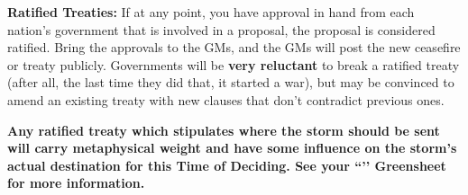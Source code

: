 \documentclass[green]{GL2020}
\begin{document}
\textbf{Ratified Treaties:}
If at any point, you have approval in hand from each nation’s government that is involved in a proposal, the proposal is considered ratified. Bring the approvals to the GMs, and the GMs will post the new ceasefire or treaty publicly. Governments will be \textbf{very reluctant} to break a ratified treaty (after all, the last time they did that, it started a war), but may be convinced to amend an existing treaty with new clauses that don’t contradict previous ones.

\textbf{Any ratified treaty which stipulates where the storm should be sent will carry metaphysical weight and have some influence on the storm’s actual destination for this Time of Deciding. See your ``\gVotingStones{}’’ Greensheet for more information.}
\end{document}
